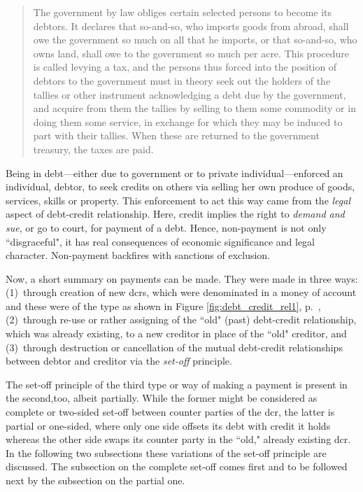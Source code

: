 \begin{quote}
The government by law 
obliges certain selected persons to become its debtors. It declares that
 so-and-so, who imports goods from abroad, shall owe the government so
 much on all that he imports, or that so-and-so, who owns land, shall owe
 to the government so much per acre. This procedure is called levying a
 tax, and the persons thus forced into the position of debtors to the
 government must in theory seek out the holders of the tallies or other
 instrument acknowledging a debt due by the government, and acquire
 from them the tallies by selling to them some commodity or in doing
 them some service, in exchange for which they may be induced to part
 with their tallies. When these are returned to the government treasury,
 the taxes are paid.~\citep[pp.~392-393]{innes1913}
\end{quote}

Being in debt---either due to government or to private individual---enforced an individual, debtor, to seek credits on others via selling her own produce of goods, services, skills or property. This enforcement to act this way came from the \textit{legal} aspect of debt-credit relationship. Here, credit implies the right to \textit{demand and sue}, or go to court, for payment of a debt. Hence, non-payment is not only ``disgraceful", it has real consequences of economic significance and legal character. Non-payment backfires with sanctions of exclusion.

Now, a short summary on payments can be made. They were made in three ways: (1)~through creation of new \acfp{dcr}, which were denominated in a money of account and these were of the type as shown in Figure \ref{fig:debt_credit_rel1}, p.~\pageref{fig:debt_credit_rel1}, (2)~through re-use or rather assigning of the ``old" (past) debt-credit relationship, which was already existing, to a new creditor in place of the ``old" creditor, and (3)~through destruction or cancellation of the mutual debt-credit relationships between debtor and creditor via the \textit{set-off} principle. 

The set-off principle of the third type or way of making a payment is present in the second,too, albeit partially. While the former might be considered as complete or two-sided set-off between counter parties of the \acf{dcr}, the latter is partial or one-sided, where only one side offsets its debt with credit it holds whereas the other side swaps its counter party in the ``old," already existing \ac{dcr}. In the following two subsections these variations of the set-off principle are discussed. The subsection on the complete set-off comes first and to be followed next by the subsection on the partial one. 

